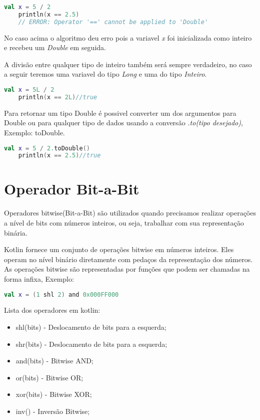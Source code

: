     \begin{lstlisting}[label={lst:example1}, language=Kotlin]
    val x = 5 / 2
    println(x == 2.5)  
    // ERROR: Operator '==' cannot be applied to 'Double'
    \end{lstlisting}
    No caso acima o algoritmo deu erro pois a variavel \emph{x} foi inicializada
    como inteiro e recebeu um \emph{Double} em seguida.
    
    A divisão entre qualquer tipo de inteiro também será sempre
    verdadeiro, no caso a seguir teremos uma variavel do tipo \emph{Long} 
    e uma do tipo \emph{Inteiro}.
    \begin{lstlisting}[label={lst:example1}, language=Kotlin]
    val x = 5L / 2
    println(x == 2L)//true
    \end{lstlisting}

    Para retornar um tipo Double é possivel converter um dos argumentos para
    Double ou para qualquer tipo de dados usando a conversão \emph{.to(tipo desejado)}, Exemplo: toDouble.
    \begin{lstlisting}[label={lst:example1}, language=Kotlin]
    val x = 5 / 2.toDouble()
    println(x == 2.5)//true
    \end{lstlisting}

\section{Operador Bit-a-Bit}

Operadores bitwise(Bit-a-Bit) são utilizados quando precisamos realizar operações 
a nível de bits com números inteiros, ou seja, trabalhar com sua 
representação binária.

Kotlin fornece um conjunto de operações bitwise em números inteiros.
Eles operam no nível binário diretamente com pedaços da representação 
dos números. As operações bitwise são representadas por funções que 
podem ser chamadas na forma infixa, Exemplo:
\begin{lstlisting}[label={lst:example1}, language=Kotlin]
  val x = (1 shl 2) and 0x000FF000
\end{lstlisting}

Lista dos operadores em kotlin:

\begin{itemize}
	\item shl(bits) - Deslocamento de bits para a esquerda;
	\item shr(bits) - Deslocamento de bits para a esquerda;
	\item and(bits) - Bitwise AND;
	\item or(bits)  - Bitwise OR;
	\item xor(bits) - Bitwise XOR;
	\item inv()     - Inversão Bitwise;
\end{itemize}

